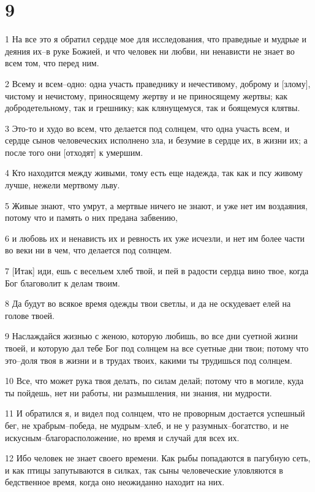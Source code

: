 \chapter{9}

\par 1 На все это я обратил сердце мое для исследования, что праведные и мудрые и деяния их--в руке Божией, и что человек ни любви, ни ненависти не знает во всем том, что перед ним.
\par 2 Всему и всем--одно: одна участь праведнику и нечестивому, доброму и [злому], чистому и нечистому, приносящему жертву и не приносящему жертвы; как добродетельному, так и грешнику; как клянущемуся, так и боящемуся клятвы.
\par 3 Это-то и худо во всем, что делается под солнцем, что одна участь всем, и сердце сынов человеческих исполнено зла, и безумие в сердце их, в жизни их; а после того они [отходят] к умершим.
\par 4 Кто находится между живыми, тому есть еще надежда, так как и псу живому лучше, нежели мертвому льву.
\par 5 Живые знают, что умрут, а мертвые ничего не знают, и уже нет им воздаяния, потому что и память о них предана забвению,
\par 6 и любовь их и ненависть их и ревность их уже исчезли, и нет им более части во веки ни в чем, что делается под солнцем.
\par 7 [Итак] иди, ешь с весельем хлеб твой, и пей в радости сердца вино твое, когда Бог благоволит к делам твоим.
\par 8 Да будут во всякое время одежды твои светлы, и да не оскудевает елей на голове твоей.
\par 9 Наслаждайся жизнью с женою, которую любишь, во все дни суетной жизни твоей, и которую дал тебе Бог под солнцем на все суетные дни твои; потому что это--доля твоя в жизни и в трудах твоих, какими ты трудишься под солнцем.
\par 10 Все, что может рука твоя делать, по силам делай; потому что в могиле, куда ты пойдешь, нет ни работы, ни размышления, ни знания, ни мудрости.
\par 11 И обратился я, и видел под солнцем, что не проворным достается успешный бег, не храбрым--победа, не мудрым--хлеб, и не у разумных--богатство, и не искусным--благорасположение, но время и случай для всех их.
\par 12 Ибо человек не знает своего времени. Как рыбы попадаются в пагубную сеть, и как птицы запутываются в силках, так сыны человеческие уловляются в бедственное время, когда оно неожиданно находит на них.

